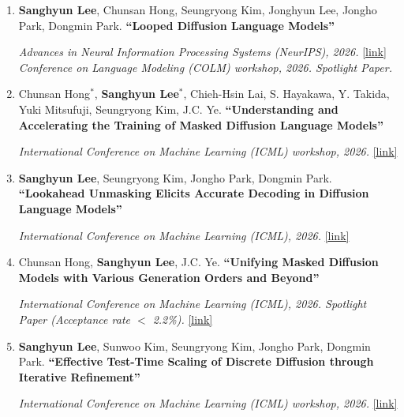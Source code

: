 \documentclass[a4paper,10.5pt]{article}
\begin{document}
\begin{enumerate}
\item \textbf{Sanghyun Lee}, Chunsan Hong, Seungryong Kim, Jonghyun Lee, Jongho Park, Dongmin Park.
\textbf{``Looped Diffusion Language Models''}
\begin{flushright}\vspace{-7pt}
\textit{Advances in Neural Information Processing Systems (NeurIPS), 2026.}
\href{https://arxiv.org/pdf/2605.26106}{[link]}
\\
\textit{Conference on Language Modeling (COLM) workshop, 2026. Spotlight Paper.}
\end{flushright}

\item Chunsan Hong$^\ast$, \textbf{Sanghyun Lee}$^\ast$, Chieh-Hsin Lai, S. Hayakawa, Y. Takida, Yuki Mitsufuji, Seungryong Kim, J.C. Ye.
\textbf{``Understanding and Accelerating the Training of Masked Diffusion Language Models''}
\begin{flushright}\vspace{-7pt}
\textit{International Conference on Machine Learning (ICML) workshop, 2026.}
\href{https://arxiv.org/abs/2605.13026}{[link]}
\end{flushright}
\item \textbf{Sanghyun Lee}, Seungryong Kim, Jongho Park, Dongmin Park.
\textbf{``Lookahead Unmasking Elicits Accurate Decoding in Diffusion Language Models''}
\begin{flushright}\vspace{-7pt}
\textit{International Conference on Machine Learning (ICML), 2026.}
\href{https://arxiv.org/pdf/2511.05563}{[link]}
\end{flushright}

\item Chunsan Hong, \textbf{Sanghyun Lee}, J.C. Ye.
\textbf{``Unifying Masked Diffusion Models with Various Generation Orders and Beyond''}
\begin{flushright}\vspace{-7pt}
\textit{International Conference on Machine Learning (ICML), 2026. Spotlight Paper (Acceptance rate $<$ 2.2\%).}
\href{https://arxiv.org/abs/2602.02112}{[link]}
\end{flushright}

\pagebreak
\item \textbf{Sanghyun Lee}, Sunwoo Kim, Seungryong Kim, Jongho Park, Dongmin Park.
\textbf{``Effective Test-Time Scaling of Discrete Diffusion through Iterative Refinement''}
\begin{flushright}\vspace{-7pt}
\textit{International Conference on Machine Learning (ICML) workshop, 2026.}
\href{https://arxiv.org/pdf/2511.05562}{[link]}
\end{flushright}


\end{enumerate}
\end{document}
